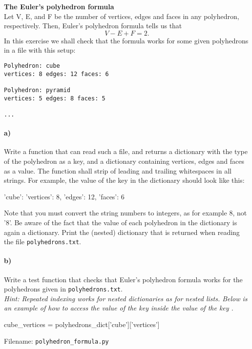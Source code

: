 \begin{Problem}{\textbf{The Euler's polyhedron formula}}
\noindent
\\Let V, E, and F be the number of vertices, edges and faces in any polyhedron, respectively. Then, Euler's polyhedron formula tells us that
$$
V-E+F=2.
$$
In this exercise we shall check that the formula works for some given polyhedrons in a file with this setup:
\begin{lstlisting}
Polyhedron: cube
vertices: 8 edges: 12 faces: 6

Polyhedron: pyramid
vertices: 5 edges: 8 faces: 5

...
\end{lstlisting}

\paragraph{a)}
Write a function that can read such a file, and returns a dictionary with the type of the polyhedron as a key, and a dictionary containing vertices, edges and faces as a value. The function shall strip of leading and trailing whitespaces in all strings. For example, the value of the key  in the dictionary should look like this:
\begin{python}
'cube': {'vertices': 8, 'edges': 12, 'faces': 6}
\end{python}
Note that you must convert the string numbers to integers, as for example $8$, not '$8$'. Be aware of the fact that the value of each polyhedron in the dictionary is again a dictionary. Print the (nested) dictionary that is returned when reading the file \texttt{polyhedrons.txt}.
\paragraph{b)}
Write a test function  that checks that Euler's polyhedron formula works for the polyhedrons given in \texttt{polyhedrons.txt}.\\
\noindent
\emph{Hint: Repeated indexing works for nested dictionaries as for nested lists. Below is an example of how to access the value of the key  inside the value of the key .}
\begin{python}
cube_vertices = polyhedrons_dict['cube']['vertices']
\end{python}

Filename: \texttt{polyhedron\_formula.py}

\end{Problem}

